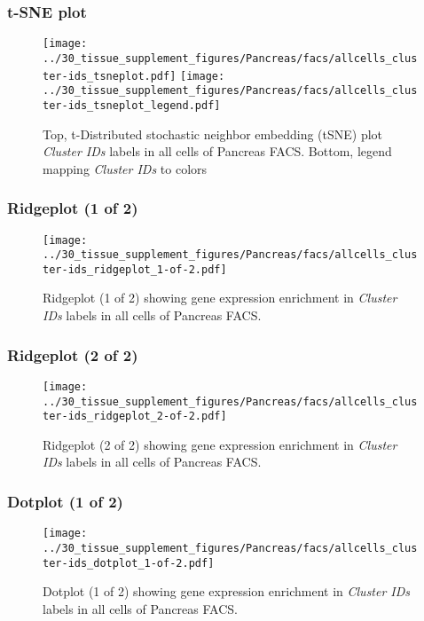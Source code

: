 \clearpage
\subsubsection{t-SNE plot}
\begin{figure}[h]
\centering
\texttt{[image: ../30\_tissue\_supplement\_figures/Pancreas/facs/allcells\_cluster-ids\_tsneplot.pdf]}
\texttt{[image: ../30\_tissue\_supplement\_figures/Pancreas/facs/allcells\_cluster-ids\_tsneplot\_legend.pdf]}
\caption{Top, t-Distributed stochastic neighbor embedding (tSNE) plot  \emph{Cluster IDs} labels in all cells of Pancreas FACS. Bottom, legend mapping \emph{Cluster IDs} to colors}
\end{figure}


\clearpage

\subsubsection{Ridgeplot (1 of 2)}
\begin{figure}[h]
\centering
\texttt{[image: ../30\_tissue\_supplement\_figures/Pancreas/facs/allcells\_cluster-ids\_ridgeplot\_1-of-2.pdf]}

\caption{ Ridgeplot (1 of 2)  showing gene expression enrichment in \emph{Cluster IDs} labels in all cells of Pancreas FACS. }
\end{figure}


\clearpage

\subsubsection{Ridgeplot (2 of 2)}
\begin{figure}[h]
\centering
\texttt{[image: ../30\_tissue\_supplement\_figures/Pancreas/facs/allcells\_cluster-ids\_ridgeplot\_2-of-2.pdf]}

\caption{ Ridgeplot (2 of 2)  showing gene expression enrichment in \emph{Cluster IDs} labels in all cells of Pancreas FACS. }
\end{figure}


\clearpage

\subsubsection{Dotplot (1 of 2)}
\begin{figure}[h]
\centering
\texttt{[image: ../30\_tissue\_supplement\_figures/Pancreas/facs/allcells\_cluster-ids\_dotplot\_1-of-2.pdf]}

\caption{ Dotplot (1 of 2)  showing gene expression enrichment in \emph{Cluster IDs} labels in all cells of Pancreas FACS. }
\end{figure}


